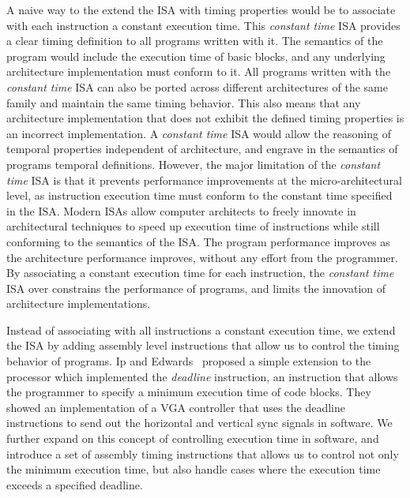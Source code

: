 A naive way to the extend the ISA with timing properties would be to associate with each instruction a constant execution time. 
This \emph{constant time} ISA provides a clear timing definition to all programs written with it.
The semantics of the program would include the execution time of basic blocks, and any underlying architecture implementation must conform to it.
All programs written with the \emph{constant time} ISA can also be ported across different architectures of the same family and maintain the same timing behavior.
This also means that any architecture implementation that does not exhibit the defined timing properties is an incorrect implementation.
A \emph{constant time} ISA would allow the reasoning of temporal properties independent of architecture, and engrave in the semantics of programs temporal definitions.     
However, the major limitation of the \emph{constant time} ISA is that it prevents performance improvements at the micro-architectural level, as instruction execution time must conform to the constant time specified in the ISA.
Modern ISAs allow computer architects to freely innovate in architectural techniques to speed up execution time of instructions while still conforming to the semantics of the ISA.  
The program performance improves as the architecture performance improves, without any effort from the programmer. 
By associating a constant execution time for each instruction, the \emph{constant time} ISA over constrains the performance of programs, and limits the innovation of architecture implementations.    

Instead of associating with all instructions a constant execution time, we extend the ISA by adding assembly level instructions that allow us to control the timing behavior of programs. 
Ip and Edwards~\cite{ip2006processor} proposed a simple extension to the processor which implemented the \emph{deadline} instruction, an instruction that allows the programmer to specify a minimum execution time of code blocks.
They showed an implementation of a VGA controller that uses the deadline instructions to send out the horizontal and vertical sync signals in software.
We further expand on this concept of controlling execution time in software, and introduce a set of assembly timing instructions that allows us to 
control not only the minimum execution time, but also handle cases where the execution time exceeds a specified deadline.

